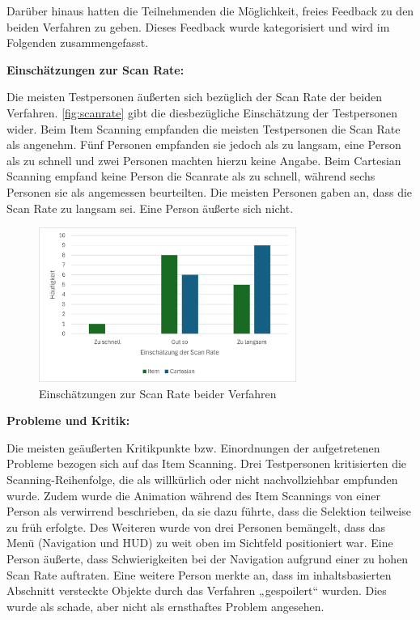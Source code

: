 Darüber hinaus hatten die Teilnehmenden die Möglichkeit, freies Feedback zu den beiden Verfahren zu geben. Dieses Feedback wurde kategorisiert und wird im Folgenden zusammengefasst. 

\textbf{Einschätzungen zur Scan Rate:}

Die meisten Testpersonen äußerten sich bezüglich der Scan Rate der beiden Verfahren. \autoref{fig:scanrate} gibt die diesbezügliche Einschätzung der Testpersonen wider. Beim Item Scanning empfanden die meisten Testpersonen die Scan Rate als angenehm. Fünf Personen empfanden sie jedoch als zu langsam, eine Person als zu schnell und zwei Personen machten hierzu keine Angabe. Beim Cartesian Scanning empfand keine Person die Scanrate als zu schnell, während sechs Personen sie als angemessen beurteilten. Die meisten Personen gaben an, dass die Scan Rate zu langsam sei. Eine Person äußerte sich nicht.

\begin{figure}[tbh]
    \centering
    \includegraphics[width=0.75\textwidth]{images/Results/ScanRate.png}
    \caption{Einschätzungen zur Scan Rate beider Verfahren}
    \label{fig:scanrate}
\end{figure}

\textbf{Probleme und Kritik:}

Die meisten geäußerten Kritikpunkte bzw. Einordnungen der aufgetretenen Probleme bezogen sich auf das Item Scanning. Drei Testpersonen kritisierten die Scanning-Reihenfolge, die als willkürlich oder nicht nachvollziehbar empfunden wurde. Zudem wurde die Animation während des Item Scannings von einer Person als verwirrend beschrieben, da sie dazu führte, dass die Selektion teilweise zu früh erfolgte. Des Weiteren wurde von drei Personen bemängelt, dass das Menü (Navigation und HUD) zu weit oben im Sichtfeld positioniert war. Eine Person äußerte, dass Schwierigkeiten bei der Navigation aufgrund einer zu hohen Scan Rate auftraten. Eine weitere Person merkte an, dass im inhaltsbasierten Abschnitt versteckte Objekte durch das Verfahren „gespoilert“ wurden. Dies wurde als schade, aber nicht als ernsthaftes Problem angesehen. 

